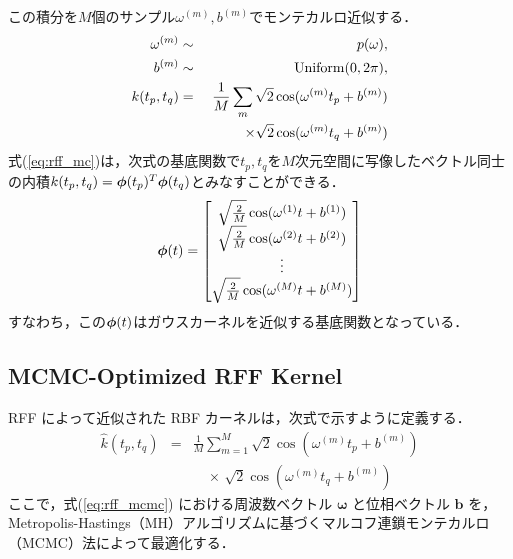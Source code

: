 \documentclass[conference]{IEEEtran}
\begin{document}
%
この積分を$M$個のサンプル$\omega^{(m)}, b^{(m)}$でモンテカルロ近似する．
%
\begin{eqnarray}
\omega^{(m)} &\sim& p(\omega), \\
b^{(m)} &\sim& {\rm Uniform}(0, 2 \pi), \\
{k}(t_p,t_q) &=& \frac{1}{M} \sum_m  \sqrt{2}\cos(\omega^{(m)} t_p +b^{(m)}) \nonumber \\
&&~~~~~~~~ \times \sqrt{2}\cos(\omega^{(m)} t_q +b^{(m)})  \label{eq:rff_mc}
\end{eqnarray}
%
式(\ref{eq:rff_mc})は，次式の基底関数で$t_p, t_q$を$M$次元空間に写像したベクトル同士の内積${k}(t_p,t_q)={\boldsymbol\phi}(t_p)^T {\boldsymbol\phi}(t_q)$とみなすことができる．
%
\begin{eqnarray}
{\boldsymbol\phi}(t) =  
\begin{bmatrix}
\sqrt{\frac{2}{M}} \cos(\omega^{(1)} t +b^{(1)}) \\
\sqrt{\frac{2}{M}} \cos(\omega^{(2)} t +b^{(2)}) \\
\vdots \\
\sqrt{\frac{2}{M}} \cos(\omega^{(M)} t +b^{(M)}) \\
\end{bmatrix}
\end{eqnarray}
%
すなわち，この${\boldsymbol\phi}(t)$はガウスカーネルを近似する基底関数となっている．

\subsection{MCMC-Optimized RFF Kernel}
RFF によって近似された RBF カーネルは，次式で示すように定義する．
\begin{eqnarray}
  \hat{k}(t_p,t_q)
    &=& \frac{1}{M}\sum_{m=1}^M \sqrt{2}\cos(\omega^{(m)}t_p + b^{(m)}) \nonumber\\
    &&\quad \times\,\sqrt{2}\cos(\omega^{(m)}t_q + b^{(m)})
  \label{eq:rff_mcmc}
\end{eqnarray}
ここで，式(\ref{eq:rff_mcmc}) における周波数ベクトル $\boldsymbol{\omega}$ と位相ベクトル $\boldsymbol{b}$ を，Metropolis-Hastings（MH）アルゴリズムに基づくマルコフ連鎖モンテカルロ（MCMC）法\cite{Hastings1970}によって最適化する．
\end{document}
